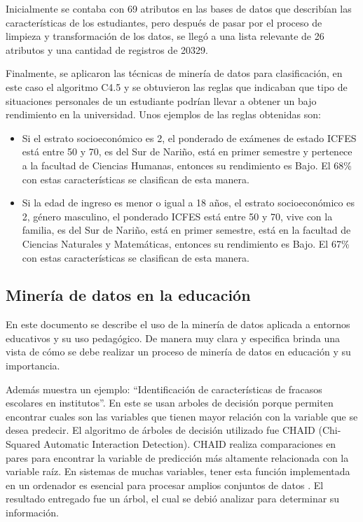 Inicialmente se contaba con 69 atributos en las bases de datos que describían las características de los estudiantes, pero después de pasar por el proceso de limpieza y transformación de los datos, se llegó a una lista relevante de 26 atributos y una cantidad de registros de 20329.

Finalmente, se aplicaron las técnicas de minería de datos para clasificación, en este caso el algoritmo C4.5 y se obtuvieron las reglas que indicaban que tipo de situaciones personales de un estudiante podrían llevar a obtener un bajo rendimiento en la universidad. Unos ejemplos de las reglas obtenidas son:
\begin{itemize}
\item Si el estrato socioeconómico es 2, el ponderado de exámenes de estado ICFES está entre 50 y 70, es del Sur de Nariño, está en primer semestre y pertenece a la facultad de Ciencias Humanas, entonces su rendimiento es Bajo. El 68\% con estas características se clasifican de esta manera. 
\item Si la edad de ingreso es menor o igual a 18 años, el estrato socioeconómico es 2, género masculino, el ponderado ICFES está entre 50 y 70, vive con la familia, es del Sur de Nariño, está en primer semestre, está en la facultad de Ciencias Naturales y Matemáticas, entonces su rendimiento es Bajo. El 67\% con estas características se clasifican de esta manera. 
\end{itemize}
\subsection{Minería de datos en la educación \cite{key-110}}
En este documento se describe el uso de la minería de datos aplicada a entornos educativos y su uso pedagógico. De manera muy clara y especifica brinda una vista de cómo se debe realizar un proceso de minería de datos en educación y su importancia.

Además muestra un ejemplo: ``Identificación de características de fracasos escolares en institutos''. En este se usan arboles de decisión porque permiten encontrar cuales son las variables que tienen mayor relación con la variable que se desea predecir. El algoritmo de árboles de decisión utilizado fue CHAID \cite{key-120} (Chi-Squared Automatic Interaction Detection). CHAID realiza comparaciones en pares para encontrar la variable de predicción más altamente relacionada con la variable raíz. En sistemas de muchas variables, tener esta función implementada en un ordenador es esencial para procesar amplios conjuntos de datos \cite{key-110}. El resultado entregado fue un árbol, el cual se debió analizar para determinar su información.
